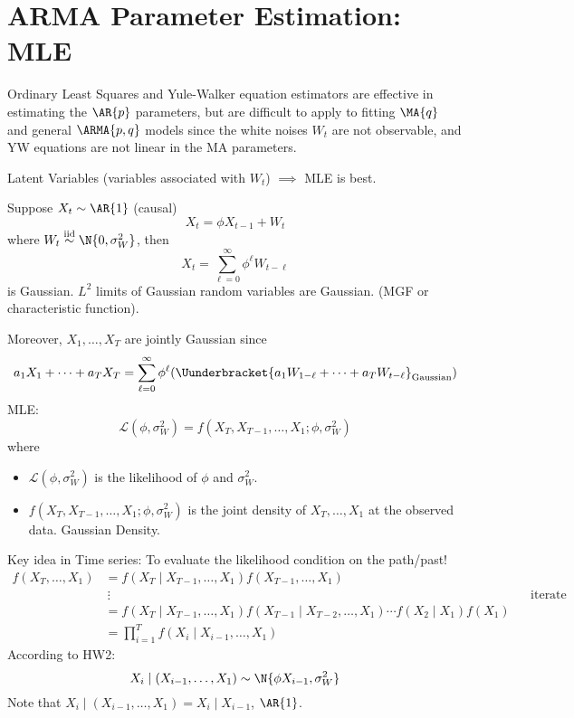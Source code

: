 \section{ARMA Parameter Estimation: MLE}
Ordinary Least Squares and Yule-Walker equation
estimators are effective in estimating the $ \AR{p} $
parameters, but are difficult to apply to fitting
$ \MA{q} $ and general $ \ARMA{p,q} $
models since the white noises $ W_t $ are not observable,
and YW equations are not linear in the MA parameters.

Latent Variables (variables associated with $ W_t $) $\implies$
MLE is best.

Suppose $ X_t \sim \AR{1} $ (causal)
\[ X_t=\phi X_{t-1}+W_t \]
where $ W_t \stackrel{\text{iid}}{\sim}\N{0,\sigma_W^2} $,
then
\[ X_t=\sum_{\ell=0}^{\infty} \phi^\ell W_{t-\ell} \]
is Gaussian. $ L^2 $ limits of Gaussian random variables are Gaussian.
(MGF or characteristic function).

Moreover, $ X_1,\ldots,X_T $ are jointly Gaussian since
\[ a_1X_1+\cdots+a_T X_T= \sum_{\ell=0}^{\infty}
    \phi^\ell (\Uunderbracket{a_1 W_{1-\ell}+\cdots+a_T W_{t-\ell}}_{\text{Gaussian}}) \]
MLE\@:
\[ \mathcal{L}(\phi,\sigma_W^2)=f(X_T, X_{T-1},\ldots,X_1;\phi,\sigma_W^2) \]
where
\begin{itemize}
    \item $\mathcal{L}(\phi,\sigma_W^2)$ is the likelihood of $ \phi $ and $ \sigma_W^2 $.
    \item $f(X_T, X_{T-1},\ldots,X_1;\phi,\sigma_W^2)$ is the joint density
          of $ X_T,\ldots,X_1 $ at the observed data. Gaussian Density.
\end{itemize}
Key idea in Time series: To evaluate the likelihood condition on
the path/past!
\begin{align*}
    f(X_T,\ldots,X_1)
     & =f(X_T\mid X_{T-1},\ldots,X_1)f(X_{T-1},\ldots,X_1)                                                            \\
     & \:\vdots                                                                                   &  & \text{iterate} \\
     & =f(X_T\mid X_{T-1},\ldots,X_1)f(X_{T-1}\mid X_{T-2},\ldots,X_1)\cdots f(X_2\mid X_1)f(X_1)                     \\
     & =\prod_{i=1}^T f(X_i\mid X_{i-1},\ldots,X_1)
\end{align*}
According to HW2:
\[ X_i \mid (X_{i-1},\ldots,X_1)\sim \N{\phi X_{i-1},\sigma_W^2} \]
Note that $  X_i \mid (X_{i-1},\ldots,X_1)=X_i\mid X_{i-1} $, $ \AR{1} $.

